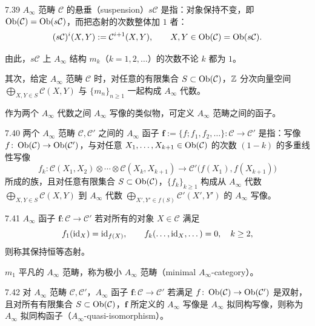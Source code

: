 \begin{definition}{7.39}
$A_\infty$ 范畴 $\mathcal C$ 的悬垂（suspension）$s\mathcal C$ 是指：对象保持不变，即 $\operatorname{Ob}(\mathcal C)=\operatorname{Ob}(s\mathcal C)$，而把态射的次数整体加 $1$ 者：
\[
  (s\mathcal C)^{i}(X,Y):=\mathcal C^{i+1}(X,Y),\qquad X,Y\in\operatorname{Ob}(\mathcal C)=\operatorname{Ob}(s\mathcal C).
\]
\end{definition}

由此，$s\mathcal C$ 上 $A_\infty$ 结构 $m_{k}$（$k=1,2,\dots$）的次数不论 $k$ 都为 $1$。

其次，给定 $A_\infty$ 范畴 $\mathcal C$ 时，对任意的有限集合 $S\subset\operatorname{Ob}(\mathcal C)$，$\mathbb{Z}$ 分次向量空间 $\bigoplus_{X,Y\in S}\mathcal C(X,Y)$ 与 $\{m_{n}\}_{n\ge 1}$ 一起构成 $A_\infty$ 代数。

作为两个 $A_\infty$ 代数之间 $A_\infty$ 写像的类似物，可定义 $A_\infty$ 范畴之间的函子。

\begin{definition}{7.40}
两个 $A_\infty$ 范畴 $\mathcal C,\mathcal C'$ 之间的 $A_\infty$ 函子 $\mathbf f:=\{f;f_{1},f_{2},\dots\}\colon\mathcal C\to\mathcal C'$ 是指：写像 $f\colon\operatorname{Ob}(\mathcal C)\to\operatorname{Ob}(\mathcal C')$，与对任意 $X_{1},\dots,X_{k+1}\in\operatorname{Ob}(\mathcal C)$ 的次数 $(1-k)$ 的多重线性写像
\[
  f_{k}\colon\mathcal C(X_{1},X_{2})\otimes\cdots\otimes\mathcal C(X_{k},X_{k+1})\longrightarrow\mathcal C'\bigl(f(X_{1}),f(X_{k+1})\bigr)
\]
所成的族，且对任意有限集合 $S\subset\operatorname{Ob}(\mathcal C)$，$\{f_{k}\}_{k\ge 1}$ 构成从 $A_\infty$ 代数 $\bigoplus_{X,Y\in S}\mathcal C(X,Y)$ 到 $A_\infty$ 代数 $\bigoplus_{X',Y'\in f(S)}\mathcal C'(X',Y')$ 的 $A_\infty$ 写像。
\end{definition}

\begin{definition}{7.41}
$A_\infty$ 函子 $\mathbf f\colon\mathcal C\to\mathcal C'$ 若对所有的对象 $X\in\mathcal C$ 满足
\[
  f_{1}(\mathrm{id}_{X})=\mathrm{id}_{f(X)},\qquad f_{k}(\dots,\mathrm{id}_{X},\dots)=0,\quad k\ge 2,
\]
则称其保持恒等态射。
\end{definition}

$m_{1}$ 平凡的 $A_\infty$ 范畴，称为极小 $A_\infty$ 范畴（minimal $A_\infty$-category）。

\begin{definition}{7.42}
对 $A_\infty$ 范畴 $\mathcal C,\mathcal C'$，$A_\infty$ 函子 $\mathbf f\colon\mathcal C\to\mathcal C'$ 若满足 $f\colon\operatorname{Ob}(\mathcal C)\to\operatorname{Ob}(\mathcal C')$ 是双射，且对所有有限集合 $S\subset\operatorname{Ob}(\mathcal C)$，$\mathbf f$ 所定义的 $A_\infty$ 写像是 $A_\infty$ 拟同构写像，则称为 $A_\infty$ 拟同构函子（$A_\infty$-quasi-isomorphism）。
\end{definition}

